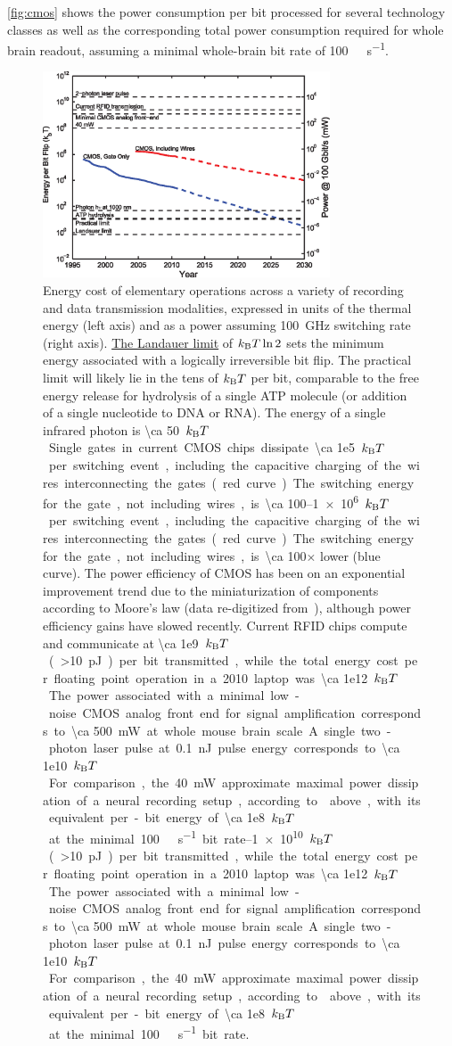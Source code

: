 \autoref{fig:cmos} shows the power consumption per bit processed for several technology classes as well as the corresponding total power consumption required for whole brain readout, assuming a minimal whole-brain bit rate of \SI{100}{\giga\bit\per\second}.

\begin{figure}[htbp]
\caption{
Energy cost of elementary operations across a variety of recording and data transmission modalities, expressed in units of the thermal energy (left axis) and as a power assuming \SI{100}{\giga\hertz} switching rate (right axis). \hyperref[eq:landauer]{The Landauer limit} of $k_{\text{\scriptsize B}} T \ln 2$ sets the minimum energy associated with a logically irreversible bit flip. The practical limit will likely lie in the tens of $k_{\text{\scriptsize B}} T$ per bit, comparable to the free energy release for hydrolysis of a single ATP molecule (or addition of a single nucleotide to DNA or RNA). The energy of a single infrared photon is \SI{\ca 50}{$k_{\text{\scriptsize B}} T$}. Single gates in current CMOS chips dissipate \SIrange{\ca 1e5}{1e6}{$k_{\text{\scriptsize B}} T$} per switching event, including the capacitive charging of the wires interconnecting the gates (red curve). The switching energy for the gate, not including wires, is \num{\ca 100}$\times$ lower (blue curve). The power efficiency of CMOS has been on an exponential improvement trend due to the miniaturization of components according to Moore's law (data re-digitized from~\cite{tucker11}), although power efficiency gains have slowed recently. Current RFID chips compute and communicate at \SIrange{\ca 1e9}{1e10}{$k_{\text{\scriptsize B}} T$} (\SI{>10}{\pico\joule}) per bit transmitted, while the total energy cost per floating point operation in a 2010 laptop was \SI{\ca 1e12}{$k_{\text{\scriptsize B}} T$}. The power associated with a minimal low-noise CMOS analog front end for signal amplification corresponds to \SI{\ca 500}{\milli\watt} at whole mouse brain scale. A single two-photon laser pulse at \SI{0.1}{\nano\joule} pulse energy corresponds to \SI{\ca 1e10}{$k_{\text{\scriptsize B}} T$}. For comparison, the \SI{40}{\milli\watt} approximate maximal power dissipation of a neural recording setup, according to  above, with its equivalent per-bit energy of \SI{\ca 1e8}{$k_{\text{\scriptsize B}} T$} at the minimal \SI{100}{\giga\bit\per\second} bit rate.
}
\label{fig:cmos}
\centering
\includegraphics[width=0.76\textwidth]{figs/Fig4.eps}
\end{figure}

